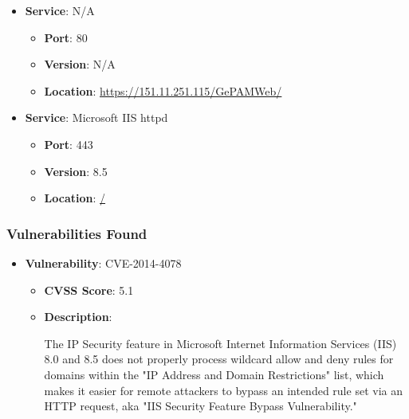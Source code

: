 \documentclass{article}
\begin{document}
\begin{itemize}
    
        \item \textbf{Service}: N/A
        \begin{itemize}
            \item \textbf{Port}: 80
            \item \textbf{Version}:  N/A 
            \item \textbf{Location}: \href{ https://151.11.251.115/GePAMWeb/ }{ https://151.11.251.115/GePAMWeb/ }
        \end{itemize}
    
        \item \textbf{Service}: Microsoft IIS httpd
        \begin{itemize}
            \item \textbf{Port}: 443
            \item \textbf{Version}:  8.5 
            \item \textbf{Location}: \href{ / }{ / }
        \end{itemize}
    
\end{itemize}


\subsubsection*{Vulnerabilities Found}

\begin{itemize}
    
        \item \textbf{Vulnerability}: CVE-2014-4078
        \begin{itemize}
            \item \textbf{CVSS Score}:  5.1 
            \item \textbf{Description}:
            \parbox[t]{0.9\linewidth}{
                \ttfamily The IP Security feature in Microsoft Internet Information Services (IIS) 8.0 and 8.5 does not properly process wildcard allow and deny rules for domains within the "IP Address and Domain Restrictions" list, which makes it easier for remote attackers to bypass an intended rule set via an HTTP request, aka "IIS Security Feature Bypass Vulnerability."
            }
        \end{itemize}
    
\end{itemize}
\end{document}

